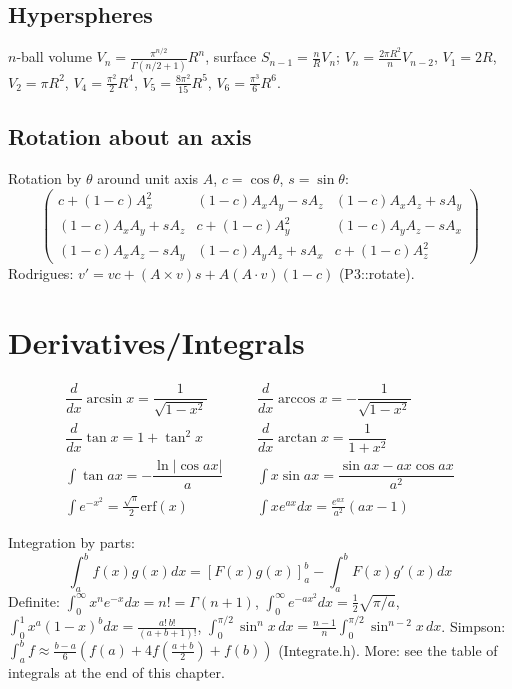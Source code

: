 \subsection{Hyperspheres}
$n$-ball volume $V_n = \frac{\pi^{n/2}}{\Gamma(n/2+1)}R^n$, surface $S_{n-1} = \frac{n}{R}V_n$;
$V_n = \frac{2\pi R^2}{n} V_{n-2}$, $V_1 = 2R$, $V_2 = \pi R^2$, $V_4 = \frac{\pi^2}{2}R^4$,
$V_5 = \frac{8\pi^2}{15}R^5$, $V_6 = \frac{\pi^3}{6}R^6$.

\subsection{Rotation about an axis}
Rotation by $\theta$ around unit axis $A$, $c = \cos\theta$, $s = \sin\theta$:
\[\begin{pmatrix}
c+(1{-}c)A_x^2 & (1{-}c)A_xA_y-sA_z & (1{-}c)A_xA_z+sA_y \\
(1{-}c)A_xA_y+sA_z & c+(1{-}c)A_y^2 & (1{-}c)A_yA_z-sA_x \\
(1{-}c)A_xA_z-sA_y & (1{-}c)A_yA_z+sA_x & c+(1{-}c)A_z^2
\end{pmatrix}\]
Rodrigues: $v' = v c + (A \times v)s + A(A\cdot v)(1-c)$ (P3::rotate).

\section{Derivatives/Integrals}
\begin{align*}
	\dfrac{d}{dx}\arcsin x = \dfrac{1}{\sqrt{1-x^2}} &&& \dfrac{d}{dx}\arccos x = -\dfrac{1}{\sqrt{1-x^2}} \\
	\dfrac{d}{dx}\tan x = 1+\tan^2 x &&& \dfrac{d}{dx}\arctan x = \dfrac{1}{1+x^2} \\
	\int\tan ax = -\dfrac{\ln|\cos ax|}{a} &&& \int x\sin ax = \dfrac{\sin ax-ax \cos ax}{a^2} \\
	\int e^{-x^2} = \frac{\sqrt \pi}{2} \text{erf}(x) &&& \int xe^{ax}dx = \frac{e^{ax}}{a^2}(ax-1)
\end{align*}

Integration by parts:
\[\int_a^bf(x)g(x)dx = [F(x)g(x)]_a^b-\int_a^bF(x)g'(x)dx\]
Definite: $\int_0^\infty x^n e^{-x}dx = n! = \Gamma(n+1)$,
$\int_0^\infty e^{-ax^2}dx = \frac12\sqrt{\pi/a}$,
$\int_0^1 x^a(1-x)^b dx = \frac{a!\,b!}{(a+b+1)!}$,
$\int_0^{\pi/2}\sin^n x\,dx = \frac{n-1}{n}\int_0^{\pi/2}\sin^{n-2}x\,dx$.
Simpson: $\int_a^b f \approx \frac{b-a}{6}(f(a) + 4f(\frac{a+b}2) + f(b))$ (Integrate.h).
More: see the table of integrals at the end of this chapter.

